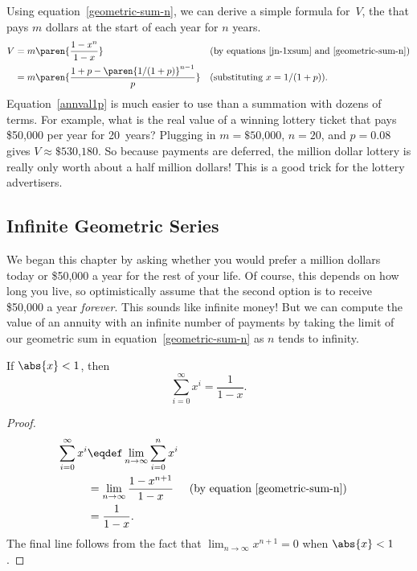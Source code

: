 Using equation~\ref{geometric-sum-n}, we can derive a simple formula
for~$V$, the  that pays $m$ dollars at the
start of each year for $n$ years.
\begin{align}
  V & = m \paren{\frac{1 - x^n}{1-x}}
      && \text{(by equations~\ref{jn-1xsum} and~\ref{geometric-sum-n})}\label{Vmfrac1x}\\
  & = m \paren{\frac{1 + p - \paren{1/(1+p)}^{n-1}}{p}}
      && \text{(substituting $x = 1/(1+p)$)}.\label{annval1p}
\end{align}
Equation~\ref{annval1p} is much easier to use than a summation with
dozens of terms.  For example, what is the real value of a winning
lottery ticket that pays \$50,000 per year for 20~years?  Plugging in
$m = \text{\$50,000}$, $n = 20$, and $p = 0.08$ gives $V \approx
\text{\$530,180}$.  So because payments are deferred, the million
dollar lottery is really only worth about a half million dollars!
This is a good trick for the lottery advertisers.

\subsection{Infinite Geometric Series}

We began this chapter by asking whether you would prefer a million
dollars today or \$50,000 a year for the rest of your life.  Of
course, this depends on how long you live, so optimistically assume
that the second option is to receive \$50,000 a year \emph{forever}.
This sounds like infinite money!  But we can compute the value of an
annuity with an infinite number of payments by taking the limit of our
geometric sum in equation~\ref{geometric-sum-n} as $n$ tends to
infinity.
\begin{theorem}\label{th:series}
If $\abs{x} < 1$, then
\[
\sum_{i=0}^\infty x^i = \frac{1}{1-x}.
\]
\end{theorem}

\begin{proof}
\begin{align*}
\sum_{i=0}^\infty x^i
   & \eqdef  \lim_{n \rightarrow \infty} \sum_{i=0}^{n} x^i \\
   & = \lim_{n \rightarrow \infty} \frac{1 - x^{n+1}}{1-x}
        & & \text{(by equation~\ref{geometric-sum-n})}\\
   & = \frac{1}{1-x}.
\end{align*}
The final line follows from the fact that $\lim_{n \rightarrow \infty}
x^{n+1} =0$ when $\abs{x} < 1$.
\end{proof}

